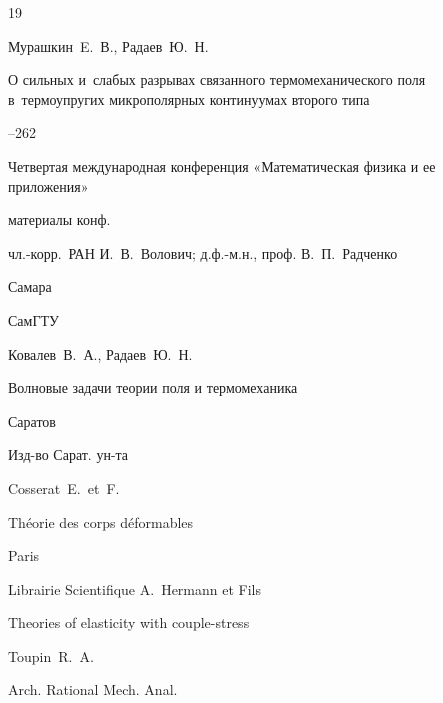 \RusRef





\begin{thebibliography}{19}




\by Мурашкин~E.~В., Радаев~Ю.~Н.

\paper О сильных и~слабых разрывах связанного термомеханического поля в~термоупругих микрополярных континуумах второго типа

--262

\inbook Четвертая международная конференция «Математическая физика и ее приложения»

\bookinfo материалы конф. 

\eds чл.-корр.~РАН И.~В.~Волович; д.ф.-м.н., проф. В.~П.~Радченко

\publaddr Самара

\publ СамГТУ







\by Ковалев~В.~А., Радаев~Ю.~Н.

\book Волновые задачи теории поля и термомеханика

\publaddr Саратов

\publ Изд-во Сарат. ун-та






\by Cosserat~E.~et~F.

\book Th\'eorie des corps d\'eformables

\publaddr Paris

\publ Librairie Scientifique A.~Hermann et Fils






\paper Theories of elasticity with couple-stress

\by Toupin~R.~A.

\jour Arch. Rational Mech. Anal.




\end{thebibliography}
